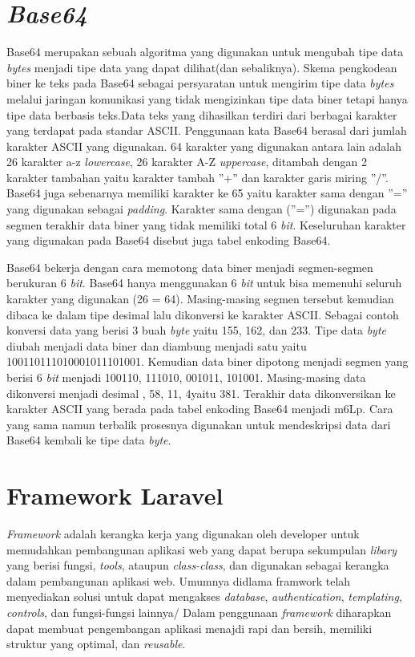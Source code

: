 \section{\textit{Base64}}
\label{sec:base64}

Base64 merupakan sebuah algoritma yang digunakan untuk mengubah tipe data \textit{bytes} menjadi tipe data yang dapat dilihat(dan sebaliknya). Skema pengkodean biner ke teks pada Base64 sebagai persyaratan untuk mengirim tipe data \textit{bytes} melalui jaringan komunikasi yang tidak mengizinkan tipe data biner tetapi hanya tipe data berbasis teks.Data teks yang dihasilkan terdiri dari berbagai karakter yang terdapat pada standar ASCII. Penggunaan kata Base64 berasal dari jumlah karakter ASCII yang digunakan. 64 karakter yang digunakan antara lain adalah 26 karakter a-z \textit{lowercase}, 26 karakter A-Z \textit{uppercase}, ditambah dengan 2 karakter tambahan yaitu karakter tambah ”+” dan karakter garis miring ”/”. Base64 juga sebenarnya memiliki karakter ke 65 yaitu karakter sama dengan ”=” yang digunakan sebagai \textit{padding}. Karakter sama dengan (”=”) digunakan pada segmen terakhir data biner yang tidak memiliki total 6 \textit{bit}. Keseluruhan karakter yang digunakan pada Base64 disebut juga tabel enkoding Base64.

Base64 bekerja dengan cara memotong data biner menjadi segmen-segmen berukuran 6 \textit{bit}. Base64 hanya menggunakan 6 \textit{bit} untuk bisa memenuhi seluruh karakter yang digunakan (26 = 64). Masing-masing segmen tersebut kemudian dibaca ke dalam tipe desimal lalu dikonversi ke karakter ASCII. Sebagai contoh konversi data yang berisi 3 buah \textit{byte} yaitu 155, 162, dan 233. Tipe data \textit{byte} diubah menjadi data biner dan diambung menjadi satu yaitu 100110111010001011101001. Kemudian data biner dipotong menjadi segmen yang berisi 6 \textit{bit} menjadi 100110, 111010, 001011, 101001. Masing-masing data dikonversi menjadi desimal , 58, 11, 4yaitu 381. Terakhir data dikonversikan ke karakter ASCII yang berada pada tabel enkoding Base64 menjadi m6Lp. Cara yang sama namun terbalik prosesnya digunakan untuk mendeskripsi data dari Base64 kembali ke tipe data \textit{byte}.\cite{juan:22:pengumpulan}

\section{Framework Laravel}
\label{sec:framework}
\textit{Framework} adalah kerangka kerja yang digunakan oleh developer untuk memudahkan pembangunan aplikasi web yang dapat berupa sekumpulan \textit{libary} yang berisi fungsi, \textit{tools}, ataupun \textit{class-class}, dan digunakan sebagai kerangka dalam pembangunan aplikasi web. Umumnya didlama framwork telah menyediakan solusi untuk dapat mengakses \textit{database}, \textit{authentication}, \textit{templating}, \textit{controls}, dan fungsi-fungsi lainnya/ Dalam penggunaan \textit{framework} diharapkan dapat membuat pengembangan aplikasi menajdi rapi dan bersih, memiliki struktur yang optimal, dan \textit{reusable}. 


